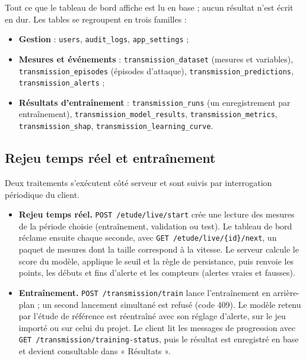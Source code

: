 Tout ce que le tableau de bord affiche est lu en base ; aucun résultat n'est
écrit en dur. Les tables se regroupent en trois familles :
\begin{itemize}
  \item \textbf{Gestion} : \texttt{users}, \texttt{audit\_logs},
        \texttt{app\_settings} ;
  \item \textbf{Mesures et événements} : \texttt{transmission\_dataset}
        (mesures et variables), \texttt{transmission\_episodes} (épisodes
        d'attaque), \texttt{transmission\_predictions},
        \texttt{transmission\_alerts} ;
  \item \textbf{Résultats d'entraînement} : \texttt{transmission\_runs} (un
        enregistrement par entraînement), \texttt{transmission\_model\_results},
        \texttt{transmission\_metrics}, \texttt{transmission\_shap},
        \texttt{transmission\_learning\_curve}.
\end{itemize}

\subsection{Rejeu temps réel et entraînement}

Deux traitements s'exécutent côté serveur et sont suivis par interrogation
périodique du client.

\begin{itemize}
  \item \textbf{Rejeu temps réel.} \texttt{POST /etude/live/start} crée une
        lecture des mesures de la période choisie (entraînement, validation ou
        test). Le tableau de bord réclame ensuite chaque seconde, avec
        \texttt{GET /etude/live/\{id\}/next}, un paquet de mesures dont la
        taille correspond à la vitesse. Le serveur calcule le score du modèle,
        applique le seuil et la règle de persistance, puis renvoie les points,
        les débuts et fins d'alerte et les compteurs (alertes vraies et
        fausses).
  \item \textbf{Entraînement.} \texttt{POST /transmission/train} lance
        l'entraînement en arrière-plan ; un second lancement simultané est
        refusé (code 409). Le modèle retenu par l'étude de référence est
        réentraîné avec son réglage d'alerte, sur le jeu importé ou sur celui du
        projet. Le client lit les messages de progression avec
        \texttt{GET /transmission/training-status}, puis le résultat est
        enregistré en base et devient consultable dans « Résultats ».
\end{itemize}

